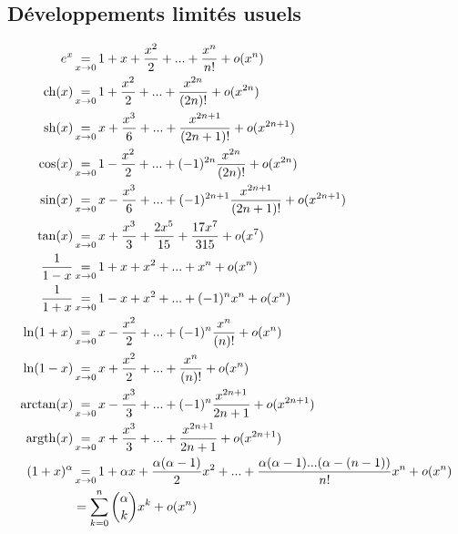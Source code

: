 \def\theme{Statistique à une ou deux variables, représentation et analyse de données}
\def\date{02/12/2023}

\def\eq{&\operatorname*{=}_{x \rightarrow 0}}
\def\ppp{+ ... +}
\newcommand{\pdl}[1]{
    + \dl{#1}\\
}

\hbox{\vspace{-0.7cm}}

\subsection{Développements limités usuels}
\vspace{-1cm}
\begin{align*}
    e^x \eq 1 + x + \frac{x^2}{2} \ppp \frac{x^n}{n!} \pdl{n}
    \ch(x) \eq 1 + \frac{x^2}{2} \ppp \frac{x^{2n}}{(2n)!} \pdl{2n}
    \sh(x) \eq x + \frac{x^3}{6} \ppp \frac{x^{2n+1}}{(2n+1)!} \pdl{2n+1}
    \cos(x) \eq 1 - \frac{x^2}{2} \ppp (-1)^{2n}\frac{x^{2n}}{(2n)!} \pdl{2n}
    \sin(x) \eq x - \frac{x^3}{6} \ppp (-1)^{2n+1}\frac{x^{2n+1}}{(2n+1)!} \pdl{2n+1}
    \tan(x) \eq x + \frac{x^3}{3} + \frac{2x^5}{15} + \frac{17x^7}{315} \pdl{7}
    \frac{1}{1-x} \eq 1 + x + x^2 \ppp x^n \pdl{n}
    \frac{1}{1+x} \eq 1 - x + x^2 \ppp (-1)^{n} x^n \pdl{n}
    \ln(1+x) \eq x - \frac{x^2}{2} \ppp (-1)^{n}\frac{x^{n}}{(n)!} \pdl{n}
    \ln(1-x) \eq x + \frac{x^2}{2} \ppp \frac{x^{n}}{(n)!} \pdl{n}
    \arctan(x) \eq x - \frac{x^3}{3} \ppp (-1)^{n}\frac{x^{2n+1}}{2n+1} \pdl{2n+1}
    \argth(x) \eq x + \frac{x^3}{3} \ppp \frac{x^{2n+1}}{2n+1} \pdl{2n+1}
    (1+x)^\alpha \eq  1 + \alpha x + \frac{\alpha(\alpha-1)}{2}x^2 
    \ppp \frac{\alpha(\alpha-1) ... (\alpha-(n-1))}{n!}x^n \pdl{n}
    &= \sum_{k=0}^{n}\binom{\alpha}{k}x^k \pdl{n}
\end{align*}